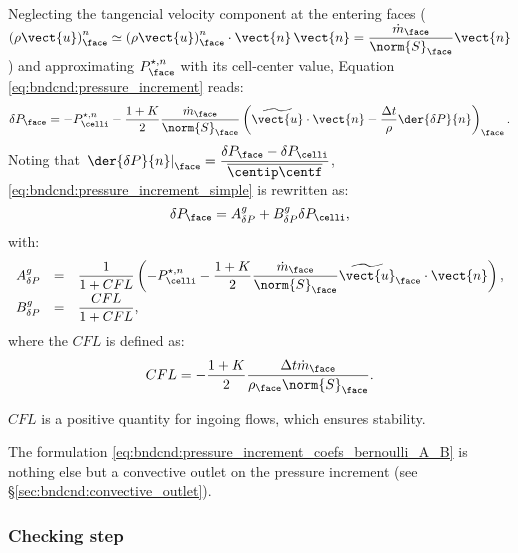 Neglecting the tangencial velocity component at the entering faces ($\left(\rho \vect{u} \right)^n_\face \simeq \left(\rho \vect{u} \right)^n_\face \cdot \vect{n} \, \vect{n} = \dfrac{ \dot{m}_\face }{\norm{S}_\face} \vect{n} $) and approximating $P^{\star, n}_\face$ with its cell-center value, Equation \ref{eq:bndcnd:pressure_increment} reads:
%
 \begin{equation}\label{eq:bndcnd:pressure_increment_simple}
\delta P_\face = -P^{\star, n}_\celli - \dfrac{1+K}{2} \dfrac{ \dot{m}_\face }{\norm{S}_\face}
\left( \widetilde{\vect{u}} \cdot \vect{n}
- \dfrac{\Delta t}{\rho} \der{\delta P }{n} \right)_\face.
\end{equation}
Noting that $  \left. \der{\delta P }{n} \right|_{\face} = \dfrac{\delta P_\face -  \delta P_\celli }{\overline{\centip \centf}}$,  \eqref{eq:bndcnd:pressure_increment_simple} is rewritten as:
\begin{equation}\label{eq:bndcnd:pressure_increment_coefs_bernoulli}
\delta P_\face = A^g_{\delta P} + B^g_{\delta P} \delta P_\celli,
\end{equation}
with:
\begin{equation}\label{eq:bndcnd:pressure_increment_coefs_bernoulli_A_B}
\begin{array}{r c l}
 A^g_{\delta P}  & = & \dfrac{1}{1 + CFL} \left( - P^{\star, n}_\celli - \dfrac{1+K}{2} \dfrac{ \dot{m}_\face }{\norm{S}_\face}
\widetilde{\vect{u}}_\face \cdot \vect{n}
  \right), \\
 B^g_{\delta P} & = & \dfrac{CFL}{1 + CFL} ,
\end{array}
\end{equation}
where the $CFL$ is defined as:
\begin{equation}\label{eq:bndcnd:pressure_increment_coefs_bernoulli_A_B}
CFL = - \dfrac{1+K}{2} \dfrac{\Delta t \dot{m}_\face }{ \rho_\face \norm{S}_\face}.
\end{equation}
%
\begin{remark}
$CFL$ is a positive quantity for ingoing flows, which ensures stability.
\end{remark}
\begin{remark}
The formulation \eqref{eq:bndcnd:pressure_increment_coefs_bernoulli_A_B} is nothing else but
a convective outlet on the pressure increment (see \S \ref{sec:bndcnd:convective_outlet}).
\end{remark}

\subsubsection{Checking step}

